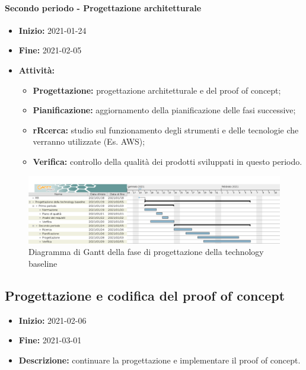 \paragraph[Secondo periodo]{Secondo periodo - \textnormal{Progettazione architetturale}}
\begin{itemize}
    \item [] \textbf{Inizio:} 2021-01-24
    \item [] \textbf{Fine:} 2021-02-05
    \item [] \textbf{Attività:}
          \begin{itemize}
              \item \textbf{Progettazione:} progettazione architetturale e del proof of concept;
              \item \textbf{Pianificazione:} aggiornamento della pianificazione delle fasi successive;
              \item \textbf{rRcerca:} studio sul funzionamento degli strumenti e delle tecnologie che verranno utilizzate (Es. AWS);
              \item \textbf{Verifica:} controllo della qualità dei prodotti sviluppati in questo periodo.
          \end{itemize}
\end{itemize}

\begin{figure}[H]
    \centering
    \includegraphics[width=1\linewidth]{res/images/pianificazione/progettazione_della_technology_baseline.png}
    \caption{Diagramma di Gantt della fase di progettazione della technology baseline}
    \label{fig:_Gantt progettazione della technology baseline}
\end{figure}


\subsection{Progettazione e codifica del proof of concept} \label{_pianificazioneCodificaPoC}
\begin{itemize}
    \item []\textbf{Inizio:} 2021-02-06
    \item []\textbf{Fine:} 2021-03-01
    \item []\textbf{Descrizione:} continuare la progettazione e implementare il proof of concept.
\end{itemize}

